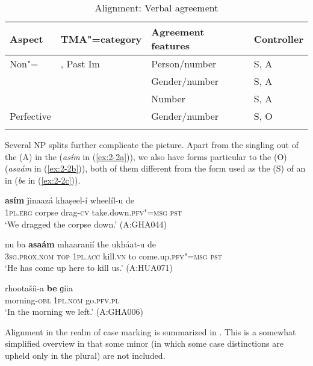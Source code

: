 \begin{table}[t]
\caption{Alignment: Verbal agreement}
\begin{tabularx}{\textwidth}{ l l Q Q }
\lsptoprule
Aspect &
TMA"=category &
Agreement features &
Controller \\\midrule
Non"= &
, Past Im &
Person/number &
S, A \\
&
 &
Gender/number &
S, A \\
&
 &
Number &
S, A \\
Perfective &
&
Gender/number &
S, O \\\lspbottomrule
\end{tabularx}
\label{tab:2-verbagr}
\end{table}

\largerpage[-1]
Several NP splits further complicate the picture. Apart from the singling out of the   (A) in the  (\textit{asím} in (\ref{ex:2-2a})), we also have  forms particular to the  (O) (\textit{asaám} in (\ref{ex:2-2b})), both of them different from the form used as the  (S) of an in  (\textit{be} in (\ref{ex:2-2c})).

\begin{exe}
\ex
\label{ex:2-2a}
\gll \textbf{asím} ǰinaazá khaṣeel-í wheelíl-u de \\
\textsc{1pl.erg} corpse drag-\textsc{cv} take.down.\textsc{pfv"=msg} \textsc{pst}  \\
\glt `We dragged the corpse down.' (A:GHA044)

\ex
\label{ex:2-2b}
\gll nu ba \textbf{asaám} mhaaranií the ukháat-u de \\
\textsc{3sg.prox.nom} \textsc{top} \textsc{1pl.acc} kill.\textsc{vn} to come.up.\textsc{pfv"=msg} \textsc{pst}  \\
\glt `He has come up here to kill us.' (A:HUA071)

\ex
\label{ex:2-2c}
\gll rhootašíi-a \textbf{be} ɡíia  \\
morning-\textsc{obl} \textsc{1pl.nom} go.\textsc{pfv.pl}  \\
\glt `In the morning we left.' (A:GHA006)
\end{exe}


Alignment in the realm of case marking is summarized in . This is a somewhat simplified overview in that some minor  (in which some case distinctions are upheld only in the plural) are not included.


